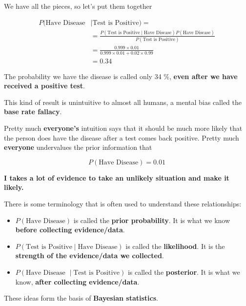 \begin{frame}

We have all the pieces, so let's put them together

\begin{align*}
P(\text{Have Disease}  & \mid \text{Test is Positive}) = \\
%
&= \frac{  P(\text{Test is
Positive} \mid \text{Have Disease}) P(\text{Have Disease}) } { P(\text{Test is
Positive}) } \\
%
&= \frac{ 0.999 \times 0.01 } {  0.999 \times 0.01 +  0.02 \times 0.99 } \\
%
&= 0.34
\end{align*}

The probability we have the disease is called only 34 \%, \textbf{even after we
have received a positive test}.

\end{frame}
%

%
\begin{frame}

This kind of result is unintuitive to almost all humans, a mental bias called the
\textbf{base rate fallacy}.

Pretty much \textbf{everyone's} intuition says that it should be much more
likely that the person does have the disease after a test comes back positive.
Pretty much \textbf{everyone} undervalues the prior information that

$$ P(\text{Have Disease}) = 0.01 $$

\textbf{I takes a lot of evidence to take an unlikely situation and make it
likely.}

\end{frame}
%

%
\begin{frame}
There is some terminology that is often used to understand these relationships:

\begin{itemize}
\item $P(\text{Have Disease})$ is called the \textbf{prior probability}.  It is
what we know \textbf{before collecting evidence/data}.
\item $P(\text{Test is Positive} \mid \text{Have Disease})$ is called the
\textbf{likelihood}.  It is the \textbf{strength of the evidence/data we collected}.
\item $P(\text{Have Disease } \mid \text{Test is Positive})$ is called the
\textbf{posterior}.  It is what we know, \textbf{after collecting evidence/data}.
\end{itemize}

These ideas form the basis of \textbf{Bayesian statistics}.

\end{frame}
%
